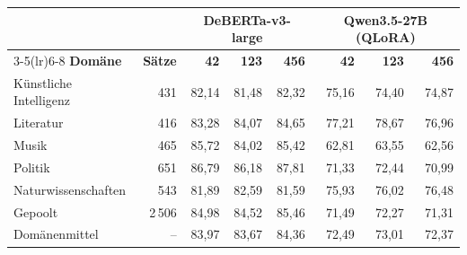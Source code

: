 \begin{tabular}{lrrrrrrr}
    \toprule
    & & \multicolumn{3}{c}{\textbf{DeBERTa-v3-large}} &
      \multicolumn{3}{c}{\textbf{Qwen3.5-27B (QLoRA)}} \\
    \cmidrule(lr){3-5}\cmidrule(lr){6-8}
    \textbf{Dom\"ane} & \textbf{S\"atze} & \textbf{42} & \textbf{123} & \textbf{456} & \textbf{42} & \textbf{123} & \textbf{456} \\
    \midrule
    K\"unstliche Intelligenz & 431 & 82,14 & 81,48 & 82,32 & 75,16 & 74,40 & 74,87 \\
    Literatur & 416 & 83,28 & 84,07 & 84,65 & 77,21 & 78,67 & 76,96 \\
    Musik & 465 & 85,72 & 84,02 & 85,42 & 62,81 & 63,55 & 62,56 \\
    Politik & 651 & 86,79 & 86,18 & 87,81 & 71,33 & 72,44 & 70,99 \\
    Naturwissenschaften & 543 & 81,89 & 82,59 & 81,59 & 75,93 & 76,02 & 76,48 \\
    \midrule
    Gepoolt & 2\,506 & 84,98 & 84,52 & 85,46 & 71,49 & 72,27 & 71,31 \\
    Dom\"anenmittel & -- & 83,97 & 83,67 & 84,36 & 72,49 & 73,01 & 72,37 \\
    \bottomrule
\end{tabular}
